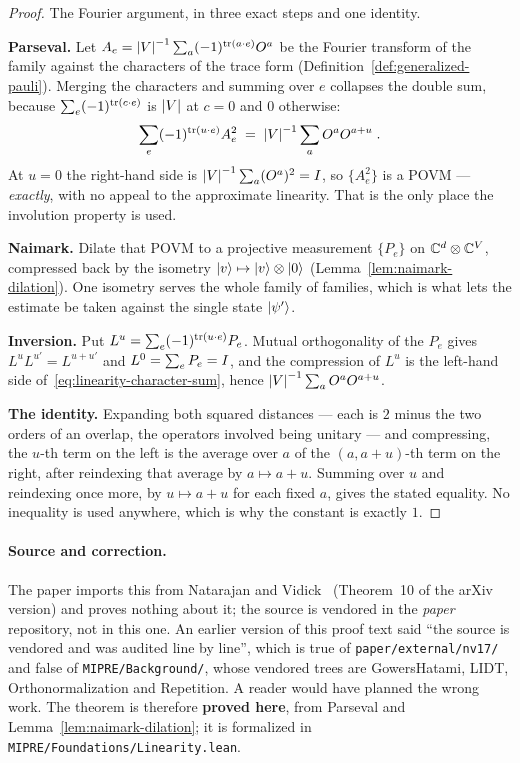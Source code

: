 \begin{proof}
\leanok
{}
The Fourier argument, in three exact steps and one identity.

\textbf{Parseval.} Let $A_e = \left\vert {V} \right\vert^{-1} \sum_a (-1)^{\operatorname{tr}(a \cdot e)} O^a$ be the Fourier
transform of the family against the characters of the trace form
(Definition~\ref{def:generalized-pauli}). Merging the characters and summing over $e$ collapses the
double sum, because $\sum_e (-1)^{\operatorname{tr}(c \cdot e)}$ is $\left\vert {V} \right\vert$ at $c = 0$ and $0$ otherwise:
\begin{equation}
  \label{eq:linearity-character-sum}
  \sum_e (-1)^{\operatorname{tr}(u \cdot e)} A_e^2 \;=\; \left\vert {V} \right\vert^{-1} \sum_a O^a O^{a + u}\;.
\end{equation}
At $u = 0$ the right-hand side is $\left\vert {V} \right\vert^{-1} \sum_a (O^a)^2 = I$, so $\{A_e^2\}$ is a POVM ---
\emph{exactly}, with no appeal to the approximate linearity. That is the only place the involution
property is used.

\textbf{Naimark.} Dilate that POVM to a projective measurement $\{P_e\}$ on
$\mathbb{C}^{d} \otimes \mathbb{C}^{V}$, compressed back by the isometry $|v\rangle \mapsto |v\rangle \otimes |0\rangle$
(Lemma~\ref{lem:naimark-dilation}). One isometry serves the whole family of families, which is what
lets the estimate be taken against the single state $|\psi'\rangle$.

\textbf{Inversion.} Put $L^u = \sum_e (-1)^{\operatorname{tr}(u \cdot e)} P_e$. Mutual orthogonality of the
$P_e$ gives $L^u L^{u'} = L^{u + u'}$ and $L^0 = \sum_e P_e = I$, and the compression of $L^u$ is
the left-hand side of~\eqref{eq:linearity-character-sum}, hence $\left\vert {V} \right\vert^{-1} \sum_a O^a O^{a+u}$.

\textbf{The identity.} Expanding both squared distances --- each is $2$ minus the two orders of an
overlap, the operators involved being unitary --- and compressing, the $u$-th term on the left is
the average over $a$ of the $(a, a+u)$-th term on the right, after reindexing that average by
$a \mapsto a + u$. Summing over $u$ and reindexing once more, by $u \mapsto a + u$ for each fixed
$a$, gives the stated equality. No inequality is used anywhere, which is why the constant is
exactly $1$.
\end{proof}

\paragraph{Source and correction.} The paper imports this from Natarajan and
Vidick~\cite{NV17} (Theorem~10 of the arXiv version) and proves nothing about it; the source is
vendored in the \emph{paper} repository, not in this one. An earlier version of this proof text said
``the source is vendored and was audited line by line'', which is true of
\texttt{paper/external/nv17/} and false of \texttt{MIPRE/Background/}, whose vendored trees are
GowersHatami, LIDT, Orthonormalization and Repetition. A reader would have planned the wrong work.
The theorem is therefore \textbf{proved here}, from Parseval and Lemma~\ref{lem:naimark-dilation};
it is formalized in \texttt{MIPRE/Foundations/Linearity.lean}.

